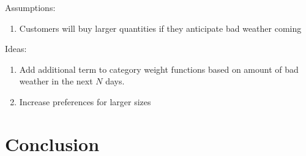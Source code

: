 \documentclass[11pt, letterpaper]{article}
\begin{document}
Assumptions:
\begin{enumerate}
\item Customers will buy larger quantities if they anticipate bad weather coming
\end{enumerate}

Ideas:
\begin{enumerate}
\item Add additional term to category weight functions based on amount of bad weather in the next $N$ days.
\item Increase preferences for larger sizes
\end{enumerate}


\section{Conclusion}


%
%
\end{document}
